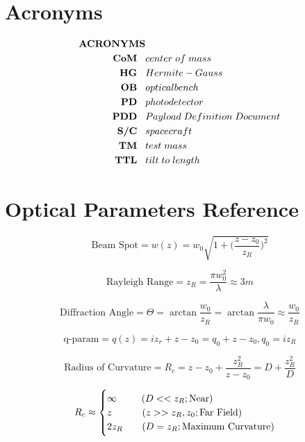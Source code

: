 \documentclass[aps,twoside,secnumarabic,balancelastpage,amsmath,amssymb,nofootinbib,hyperref=pdftex]{revtex4}
\newcommand\tab[1][3mm]{\hspace*{#1}}
\begin{document}
\newpage
\section{Acronyms}
\begin{align*}
\textbf{ACRONYMS}&\\
\textbf{CoM}\tab& center\; of\; mass\\
\textbf{HG}\tab &Hermite-Gauss\\
\textbf{OB}\tab &optical bench\\
\textbf{PD}\tab &photodetector\\
\textbf{PDD}\tab &Payload\; Definition\; Document\\
\textbf{S/C}\tab &spacecraft\\
\textbf{TM}\tab &test\; mass\\
\textbf{TTL}\tab &tilt\; to\; length\\
\end{align*}

\newpage
\section{Optical Parameters Reference}

\begin{equation}
\text{Beam Spot}
= w(z)
 = w_0 \sqrt{1 + \big( \frac{z-z_0}{z_R} \big)^2}
\end{equation}

\begin{equation}
\text{Rayleigh Range}
= z_R = \frac{\pi w_0^2}{\lambda} \approx 3 m
\end{equation}

\begin{equation}
\text{Diffraction Angle}
= \Theta
 = \arctan \frac{w_0}{z_R} = \arctan \frac{\lambda}{\pi w_0} \approx \frac{w_0}{z_R}
\end{equation}

\begin{equation}
\text{q-param}
= q(z)
 = i z_r + z - z_0 = q_0 + z - z_0 , q_0 = i z_R
\end{equation}

\begin{equation}
\text{Radius of Curvature}
= R_c
 = z-z_0+ \frac{z_R^2}{z-z_0}
 = D + \frac{z_R^2}{D}
\end{equation}

\[
  R_c \approx \begin{cases}
               \infty \tab\tab\tab(D<<z_R ; \text{Near})\\
               z \tab\tab\tab\;\;(z>>z_R,z_0 ; \text{Far Field})\\
               2 z_R \tab\tab\;(D=z_R; \text{Maximum Curvature})
            \end{cases}
\]
\end{document}
